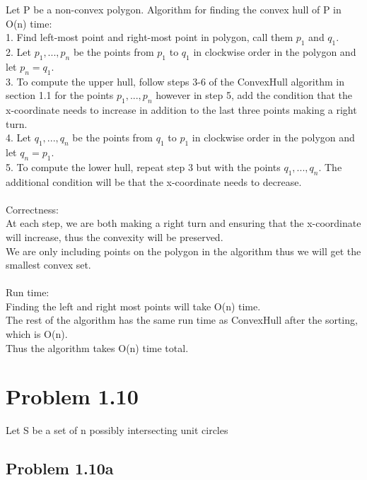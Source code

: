 \documentclass[11pt,psfig]{article}
\begin{document}
Let P be a non-convex polygon. Algorithm for finding the convex hull of P in O(n) time:
\\
1. Find left-most point and right-most point in polygon, call them $p_1$ and $q_1$. \\
2. Let $p_1,...,p_n$ be the points from $p_1$ to $q_1$ in clockwise order in the polygon and let $p_n=q_1$. \\
3. To compute the upper hull, follow steps 3-6 of the ConvexHull algorithm in section 1.1 for the points $p_1,...,p_n$ however in step 5, add the condition that the x-coordinate needs to increase in addition to the last three points making a right turn.\\
4. Let $q_1,...,q_n$ be the points from $q_1$ to $p_1$ in clockwise order in the polygon and let $q_n=p_1$. \\
5. To compute the lower hull, repeat step 3 but with the points $q_1,...,q_n$. The additional condition will be that the x-coordinate needs to decrease. 
\\
\\
Correctness:\\
At each step, we are both making a right turn and ensuring that the x-coordinate will increase, thus the convexity will be preserved. \\
We are only including points on the polygon in the algorithm thus we will get the smallest convex set. \\
\\
Run time:\\
Finding the left and right most points will take O(n) time.\\
The rest of the algorithm has the same run time as ConvexHull after the sorting, which is O(n).\\
Thus the algorithm takes O(n) time total.

\newpage


\section*{Problem 1.10}

Let S be a set of n possibly intersecting unit circles

\subsection*{Problem 1.10a}
\end{document}

